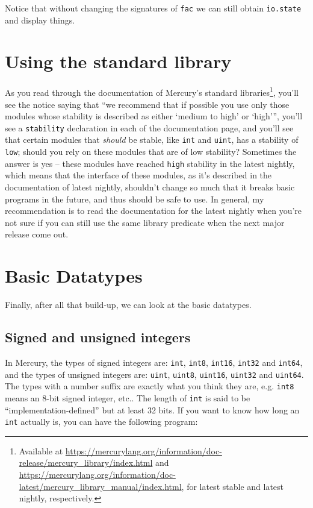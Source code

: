 Notice that without changing the signatures of \texttt{fac} we can still obtain \texttt{io.state} and display things.

\section{Using the standard library}

As you read through the documentation of Mercury's standard libraries\footnote{Available at \url{https://mercurylang.org/information/doc-release/mercury_library/index.html} and \url{https://mercurylang.org/information/doc-latest/mercury_library_manual/index.html}, for latest stable and latest nightly, respectively.}, you'll see the notice saying that ``we recommend that if possible you use only those modules whose stability is described as either `medium to high' or `high''', you'll see a \texttt{stability} declaration in each of the documentation page, and you'll see that certain modules that \textit{should} be stable, like \texttt{int} and \texttt{uint}, has a stability of \texttt{low}; should you rely on these modules that are of low stability? Sometimes the answer is yes -- these modules have reached \texttt{high} stability in the latest nightly, which means that the interface of these modules, as it's described in the documentation of latest nightly, shouldn't change so much that it breaks basic programs in the future, and thus should be safe to use. In general, my recommendation is to read the documentation for the latest nightly when you're not sure if you can still use the same library predicate when the next major release come out.

\section{Basic Datatypes}

Finally, after all that build-up, we can look at the basic datatypes.

\subsection{Signed and unsigned integers}

In Mercury, the types of signed integers are: \texttt{int}, \texttt{int8}, \texttt{int16}, \texttt{int32} and \texttt{int64}, and the types of unsigned integers are: \texttt{uint}, \texttt{uint8}, \texttt{uint16}, \texttt{uint32} and \texttt{uint64}. The types with a number suffix are exactly what you think they are, e.g. \texttt{int8} means an 8-bit signed integer, etc.. The length of \texttt{int} is said to be ``implementation-defined'' but at least 32 bits. If you want to know how long an \texttt{int} actually is, you can have the following program:

